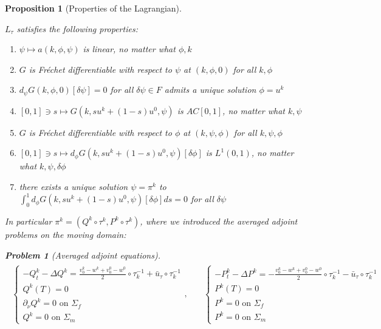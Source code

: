 \documentclass[english,a4paper,9pt,oneside]{scrbook}	%
\theoremstyle{break}
\newtheorem{prop}[equation]{Proposition}
\newtheorem{pb}[equation]{Problem}
\theoremstyle{remark}
\newcommand{\ds}{\displaystyle}
\begin{document}
\begin{prop}[Properties of the Lagrangian]
\label{prop:lagr}

$L_\tau$ satisfies the following properties:

\begin{enumerate}
	\item $\psi \mapsto a(k, \phi,\psi)$ is linear, no matter what $\phi,k$
	\item $G$ is Fréchet differentiable with respect to $\psi$ at $(k,\phi,0)$ for all $k, \phi$
	\item $d_\psi G(k,\phi,0)[\delta \psi]=0$ for all $\delta \psi \in F$ admits a unique solution $\phi = u^k$
	\item $[0,1]\ni s \mapsto G(k, su^k + (1-s)u^0,\psi)$ is $AC[0,1]$, no matter what $k, \psi$
	\item $G$ is Fréchet differentiable with respect to $\phi$ at $(k,\psi,\phi)$ for all $k, \psi, \phi$
	\item $[0,1]\ni s \mapsto d_\phi G(k, su^k + (1-s)u^0,\psi)[\delta \phi]$ is $L^1(0,1)$, no matter what $k, \psi, \delta \phi$
	\item there exists a unique solution $\psi = \pi^k$ to $\ds \int_0^1 d_\phi G(k, su^k + (1-s)u^0,\psi)[\delta \phi]ds =0$ for all $\delta \psi$ 
\end{enumerate}

In particular $\pi^k = (Q^k \circ \tau^k,P^k \circ \tau^k)$, where we introduced the averaged adjoint problems on the moving domain:

\begin{pb}[Averaged adjoint equations]
\label{pb:avg_adj_pb}
\begin{align*}
\begin{matrix}
\left\{\begin{matrix}
-Q^k_t-\Delta Q^k =\frac{v_0^k-w^k+v_0^0-w^0}{2}\circ \tau_k^{-1}+\bar{u}_\tau\circ \tau_k^{-1} \\
Q^k(T)=0\\
\partial_\nu Q^k = 0 \text{ on } \Sigma_f\\
Q^k = 0 \text{ on } \Sigma_m
\end{matrix}\right.
, \quad &
\left\{\begin{matrix}
-P^k_t-\Delta P^k =-\frac{v_0^k-w^k+v_0^0-w^0}{2}\circ \tau_k^{-1}-\bar{u}_\tau\circ \tau_k^{-1} \\
P^k(T)=0\\
P^k = 0 \text{ on } \Sigma_f\\
P^k = 0 \text{ on } \Sigma_m
\end{matrix}\right.
\end{matrix}
\end{align*}
\end{pb}

\end{prop}
\end{document}
